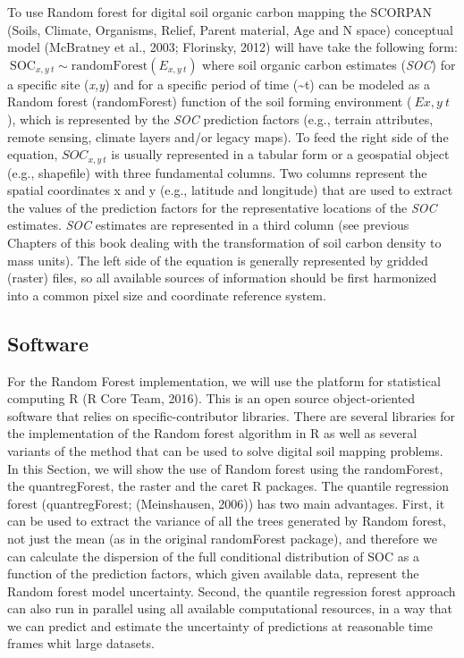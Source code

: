 \documentclass[10pt,b5paper,]{book}
\theoremstyle{definition}
\theoremstyle{definition}
\theoremstyle{definition}
\theoremstyle{remark}
\begin{document}
To use Random forest for digital soil organic carbon mapping the SCORPAN
(Soils, Climate, Organisms, Relief, Parent material, Age and N space)
conceptual model (McBratney et al., 2003; Florinsky, 2012) will have
take the following form:
\(\ \text{SOC}_{x,y~t} \sim \text{randomForest} (E_{x,y~t})\) where soil
organic carbon estimates (\emph{SOC}) for a specific site (\emph{x,y})
and for a specific period of time (\textasciitilde{}t) can be modeled as
a Random forest (randomForest) function of the soil forming environment
(\(\ Ex,y~t\)), which is represented by the \emph{SOC} prediction
factors (e.g., terrain attributes, remote sensing, climate layers and/or
legacy maps). To feed the right side of the equation, \(SOC_{x,y~t}\) is
usually represented in a tabular form or a geospatial object (e.g.,
shapefile) with three fundamental columns. Two columns represent the
spatial coordinates x and y (e.g., latitude and longitude) that are used
to extract the values of the prediction factors for the representative
locations of the \emph{SOC} estimates. \emph{SOC} estimates are
represented in a third column (see previous Chapters of this book
dealing with the transformation of soil carbon density to mass units).
The left side of the equation is generally represented by gridded
(raster) files, so all available sources of information should be first
harmonized into a common pixel size and coordinate reference system.

\hypertarget{software}{%
\subsection{Software}\label{software}}

For the Random Forest implementation, we will use the platform for
statistical computing R (R Core Team, 2016). This is an open source
object-oriented software that relies on specific-contributor libraries.
There are several libraries for the implementation of the Random forest
algorithm in R as well as several variants of the method that can be
used to solve digital soil mapping problems. In this Section, we will
show the use of Random forest using the randomForest, the
quantregForest, the raster and the caret R packages. The quantile
regression forest (quantregForest; (Meinshausen, 2006)) has two main
advantages. First, it can be used to extract the variance of all the
trees generated by Random forest, not just the mean (as in the original
randomForest package), and therefore we can calculate the dispersion of
the full conditional distribution of SOC as a function of the prediction
factors, which given available data, represent the Random forest model
uncertainty. Second, the quantile regression forest approach can also
run in parallel using all available computational resources, in a way
that we can predict and estimate the uncertainty of predictions at
reasonable time frames whit large datasets.
\end{document}
